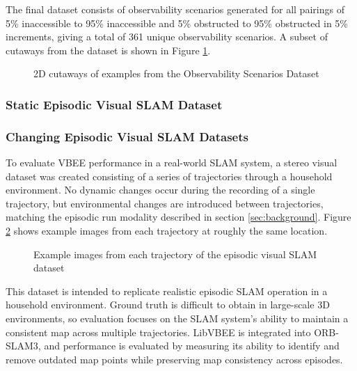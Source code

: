 \begin{singlespace}
    \begin{algorithm}[H]
        \caption[Generate Observability Scenario]{$\operatorname{GenerateObservabilityScenario}$}
        \label{alg:generate_observability_scenario}
        \begin{algorithmic}
            \EndFunction
        \end{algorithmic}
    \end{algorithm}
\end{singlespace}

The final dataset consists of observability scenarios generated for all pairings of 5\% inaccessible to 95\% inaccessible and 5\% obstructed to 95\% obstructed in 5\% increments, giving a total of 361 unique observability scenarios. A subset of cutaways from the dataset is shown in Figure \ref{fig:observability_scenarios}.

\begin{figure}[H]
    \centering
    \caption{2D cutaways of examples from the Observability Scenarios Dataset}
    \label{fig:observability_scenarios}
\end{figure}

\subsubsection{Static Episodic Visual SLAM Dataset}

\subsubsection{Changing Episodic Visual SLAM Datasets}
To evaluate VBEE performance in a real-world SLAM system, a stereo visual dataset was created consisting of a series of trajectories through a household environment. No dynamic changes occur during the recording of a single trajectory, but environmental changes are introduced between trajectories, matching the episodic run modality described in section \ref{sec:background}. Figure \ref{fig:episodic_datasets} shows example images from each trajectory at roughly the same location.

\begin{figure}[H]
    \centering
    \caption{Example images from each trajectory of the episodic visual SLAM dataset}
    \label{fig:episodic_datasets}
\end{figure}

This dataset is intended to replicate realistic episodic SLAM operation in a household environment. Ground truth is difficult to obtain in large-scale 3D environments, so evaluation focuses on the SLAM system's ability to maintain a consistent map across multiple trajectories. LibVBEE is integrated into ORB-SLAM3, and performance is evaluated by measuring its ability to identify and remove outdated map points while preserving map consistency across episodes.
